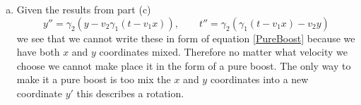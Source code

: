 \documentclass[11pt]{article}
\numberwithin{equation}{section}
\begin{document}
\begin{enumerate}[(a)]
\item
    Given the results from part (c) 
    $$y'' = \gamma_2(y-v_2\gamma_1(t-v_1x)),\qquad t'' = \gamma_2(\gamma_1(t-v_1x)-v_2y)$$
    we see that we cannot write these in form of equation \ref{PureBoost} because we have both $x$ and $y$ coordinates 
    mixed. Therefore no matter what velocity we choose we cannot make place it in the form of a pure boost.
    The only way to make it a pure boost is too mix the $x$ and $y$ coordinates into a new coordinate $y'$ this describes a rotation.

\end{enumerate}
\end{document}
